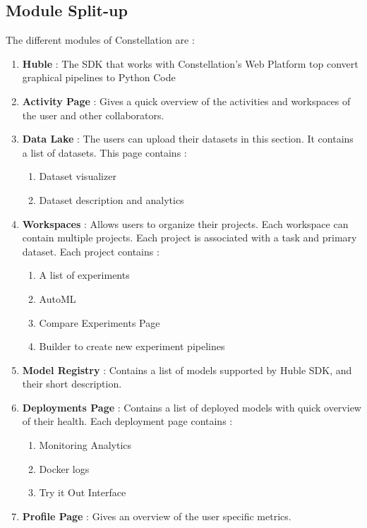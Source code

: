 \documentclass[12pt,a4paper]{report}     %
\begin{document}
\begin{normalsize}
{\subsection{Module Split-up}
The different modules of Constellation are :
\begin{enumerate}
\item \textbf{Huble} : The SDK that works with Constellation's Web Platform top convert graphical pipelines to Python Code
\item \textbf{Activity Page} : Gives a quick overview of the activities and workspaces of the user and other collaborators.
\item \textbf{Data Lake} : The users can upload their datasets in this section. It contains a list of datasets. This page contains : 
\begin{enumerate}
\item Dataset visualizer 
\item Dataset description and analytics
\end{enumerate}
\item \textbf{Workspaces} : Allows users to organize their projects. Each workspace can contain multiple projects. Each project is associated with a task and primary dataset. Each project contains :
\begin{enumerate}
\item A list of experiments
\item AutoML
\item Compare Experiments Page
\item Builder to create new experiment pipelines
\end{enumerate}
\item \textbf{Model Registry} : Contains a list of models supported by Huble SDK, and their short description.
\item \textbf{Deployments Page} : Contains a list of deployed models with quick overview of their health. Each deployment page contains :
\begin{enumerate}
\item Monitoring Analytics
\item Docker logs
\item Try it Out Interface
\end{enumerate}
\item \textbf{Profile Page} : Gives an overview of the user specific metrics.
\end{enumerate}
}
\end{normalsize}
\end{document}
